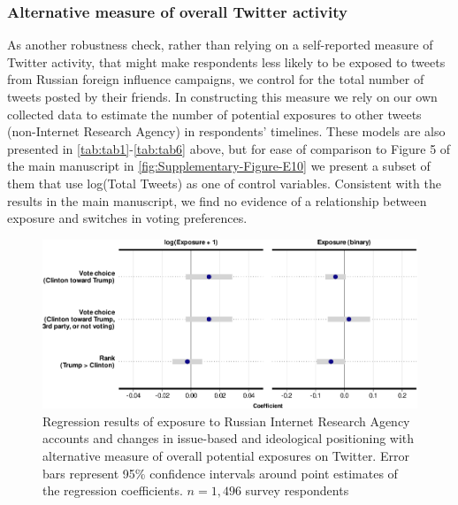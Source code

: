\documentclass[
  12pt,
]{article}
\begin{document}
\clearpage

\hypertarget{alternative-measure-of-overall-twitter-activity}{%
\subsubsection{Alternative measure of overall Twitter activity}\label{alternative-measure-of-overall-twitter-activity}}

As another robustness check, rather than relying on a self-reported measure of Twitter activity, that might make respondents less likely to be exposed to tweets from Russian foreign influence campaigns, we control for the total number of tweets posted by their friends. In constructing this measure we rely on our own collected data to estimate the number of potential exposures to other tweets (non-Internet Research Agency) in respondents' timelines. These models are also presented in \ref{tab:tab1}-\ref{tab:tab6} above, but for ease of comparison to Figure 5 of the main manuscript in \autoref{fig:Supplementary-Figure-E10} we present a subset of them that use log(Total Tweets) as one of control variables. Consistent with the results in the main manuscript, we find no evidence of a relationship between exposure and switches in voting preferences.

\begin{figure}
\centering
\includegraphics{Supplementary_Information_files/figure-latex/Supplementary-Figure-E10-1.pdf}
\caption{\label{fig:Supplementary-Figure-E10}Regression results of exposure to Russian Internet Research Agency accounts and changes in issue-based and ideological positioning with alternative measure of overall potential exposures on Twitter. Error bars represent 95\% confidence intervals around point estimates of the regression coefficients. \(n = 1,496\) survey respondents}
\end{figure}

\clearpage
\end{document}
